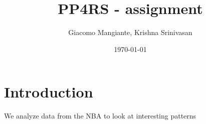 \documentclass[12pt]{article}
\begin{document}
\title{PP4RS  - assignment}
\author{Giacomo Mangiante, Krishna Srinivasan}
\date{\today}
\maketitle

\section{Introduction}
We analyze data from the NBA to look at interesting patterns 
\end{document}
